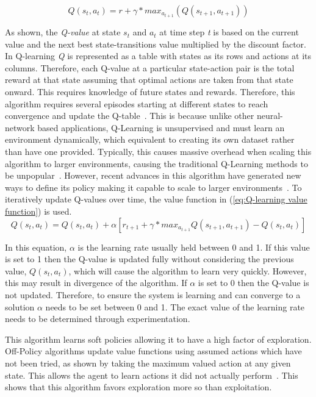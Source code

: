 \documentclass[12pt,american]{report}
\begin{document}
        \begin{equation}
            \label{eq:bellman}
            Q(s_{t},a_{t}) = r + \gamma*max_{a_{t+1} }(Q(s_{t+1},a_{t+1}))
        \end{equation}

        As shown, the \textit{Q-value} at state \textit{$s_t$} and \textit{$a_t$} at time step \textit{t} is based on the current value and the next best state-transitions value multiplied by the discount factor. In Q-learning \textit{Q} is represented as a table with states as its rows and actions at its columns.  Therefore, each Q-value at a particular state-action pair is the total reward at that state assuming that optimal actions are taken from that state onward.  This requires knowledge of future states and rewards.  Therefore, this algorithm requires several episodes starting at different states to reach convergence and update the Q-table~\cite{Watkins:1992}. This is because unlike other neural-network based applications, Q-Learning is unsupervised and must learn an environment dynamically, which equivalent to creating its own dataset rather than have one provided. Typically, this causes massive overhead when scaling this algorithm to larger environments, causing the traditional Q-Learning methods to be unpopular~\cite{peng2015mobile}.  However, recent advances in this algorithm have generated new ways to define its policy making it capable to scale to larger environments~\cite{Greedy}. To iteratively update Q-values over time, the value function in (\ref{eq:Q-learning value function}) is used. 
        \begin{equation}
            \label{eq:Q-learning value function}
            Q(s_{t},a_{t}) = Q(s_{t},a_{t}) + \alpha[r_{t+1} + \gamma*max_{a_{t+1} }Q(s_{t+1},a_{t+1})-Q(s_{t},a_{t})]
        \end{equation}

        In this equation, \textit{$\alpha$} is the learning rate usually held between 0 and 1.  If this value is set to 1 then the Q-value is updated fully without considering the previous value, \textit{$Q(s_t,a_t)$}, which will cause the algorithm to learn very quickly. However, this may result in divergence of the algorithm.  If \textit{$\alpha$} is set to 0 then the Q-value is not updated.  Therefore, to ensure the system is learning and can converge to a solution \textit{$\alpha$} needs to be set between 0 and 1. The exact value of the learning rate needs to be determined through experimentation.

        This algorithm learns soft policies allowing it to have a high factor of exploration. Off-Policy algorithms update value functions using assumed actions which have not been tried, as shown by taking the maximum valued action at any given state.  This allows the agent to learn actions it did not actually perform~\cite{Eden}. This shows that this algorithm favors exploration more so than exploitation.  
\end{document}
